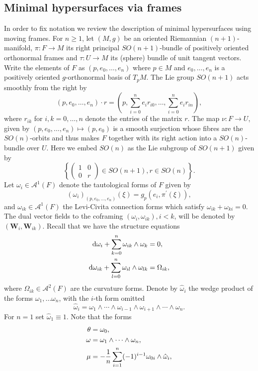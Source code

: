 \documentclass[11pt,letterpaper]{amsart}
\theoremstyle{definition}
\numberwithin{equation}{section}
\begin{document}
\subsection{Minimal hypersurfaces via frames}
In order to fix notation we review the description of minimal hypersurfaces using moving frames. For $n \geq 1$, let $(M,g)$ be an oriented Riemannian $(n+1)$-manifold, $\pi : F \to M$ its right principal $SO(n+1)$-bundle of positively oriented orthonormal frames and $\tau : U \to M$ its (sphere) bundle of unit tangent vectors. Write the elements of $F$ as $(p,e_0,\ldots,e_n)$ where $p \in M$ and $e_0,\ldots,e_n$ is a positively oriented $g$-orthonormal basis of $T_pM$. The Lie group $SO(n+1)$ acts smoothly from the right by
$$
(p,e_0,\ldots,e_n)\cdot r=\left(p,\sum_{i=0}^n e_i r_{i0},\dots, \sum_{i=0}^n e_i r_{in}\right),
$$
where $r_{ik}$ for $i,k=0,\ldots,n$ denote the entries of the matrix $r$. The map $\nu : F \to U$, given by $(p,e_0,\ldots,e_n) \mapsto (p,e_0)$ is a smooth surjection whose fibres are the $SO(n)$-orbits and thus makes $F$ together with its right action into a $SO(n)$-bundle over $U$. Here we embed $SO(n)$ as the Lie subgroup of $SO(n+1)$ given by 
$$
\left\{\left(\begin{array}{cc} 1 & 0 \\ 0 & r \end{array}\right) \in SO(n+1), r \in SO(n) \right\}.
$$
Let $\omega_i \in \mathcal{A}^1(F)$ denote the tautological forms of $F$ given by 
$$
\left(\omega_i\right)_{(p,e_0,\ldots,e_n)}(\xi)=g_p\left(e_i,\pi^{\prime}(\xi)\right), 
$$
and $\omega_{ik} \in \mathcal{A}^1(F)$ the Levi-Civita connection forms which satisfy $\omega_{ik}+\omega_{ki}=0$. The dual vector fields to the coframing $\left(\omega_i,\omega_{ik}\right), i < k$, will be denoted by $\left({\mathbf{W}}_i,{\mathbf{W}}_{ik}\right)$. Recall that we have the structure equations
\begin{equation}\label{struceq}
\aligned
{\mathrm{d}}\omega_i+\sum_{k=0}^n\omega_{ik}\wedge\omega_k&=0,\\
{\mathrm{d}}\omega_{ik}+\sum_{l=0}^n\omega_{il}\wedge\omega_{lk}&=\Omega_{ik},
\endaligned
\end{equation}
where $\Omega_{ik} \in \mathcal{A}^2(F)$ are the curvature forms. Denote by $\hat{\omega}_i$ the wedge product of the forms $\omega_1,\ldots \omega_n$, with the $i$-th form omitted
$$
\hat{\omega}_i=\omega_1\wedge\cdots\wedge\omega_{i-1}\wedge\omega_{i+1}\wedge \cdots \wedge \omega_n.
$$
For $n=1$ set $\hat{\omega}_1\equiv1.$ Note that the forms 
$$
\aligned
\theta&=\omega_0,\\ 
\omega&=\omega_1\wedge \cdots \wedge \omega_n,\\ 
\mu&=-\frac{1}{n}\sum_{i=1}^n (-1)^{i-1}\omega_{0i} \wedge \hat{\omega}_i,\\
\endaligned
$$
\end{document}
